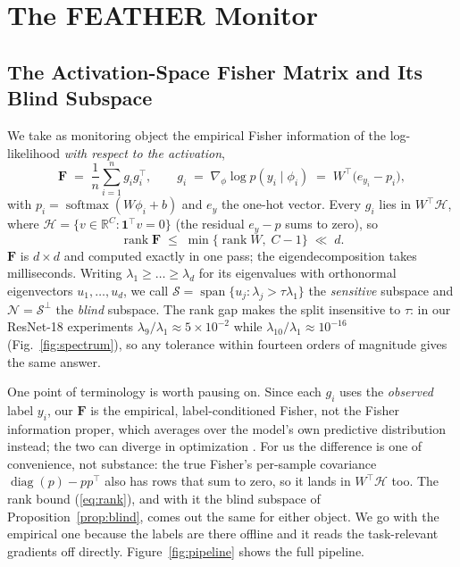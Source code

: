 \documentclass[graybox]{SNmult}
\newcommand{\R}{\mathbb{R}}
\newcommand{\F}{\mathbf{F}}
\newcommand{\act}{\phi}
\DeclareMathOperator{\rank}{rank}
\DeclareMathOperator{\diag}{diag}
\DeclareMathOperator{\spn}{span}
\DeclareMathOperator*{\softmax}{softmax}
\begin{document}
\section{The FEATHER Monitor}
\label{sec:method}

\subsection{The Activation-Space Fisher Matrix and Its Blind Subspace}
\label{sec:blind}

We take as monitoring object the empirical Fisher information of the
log-likelihood \emph{with respect to the activation},
\begin{equation}
  \F \;=\; \frac{1}{n}\sum_{i=1}^{n} g_i g_i^\top,
  \qquad
  g_i \;=\; \nabla_{\act}\log p(y_i \mid \act_i)
        \;=\; W^\top\!\big(e_{y_i} - p_i\big),
  \label{eq:fisher}
\end{equation}
with $p_i = \softmax(W\act_i + b)$ and $e_y$ the one-hot vector. Every $g_i$
lies in $W^\top\!\mathcal{H}$, where
$\mathcal{H} = \{v \in \R^C : \mathbf{1}^\top v = 0\}$ (the residual
$e_y - p$ sums to zero), so
\begin{equation}
  \rank \F \;\le\; \min\{\rank W,\; C-1\} \;\ll\; d .
  \label{eq:rank}
\end{equation}
$\F$ is $d \times d$ and computed exactly in one pass; the eigendecomposition
takes milliseconds. Writing $\lambda_1 \ge \dots \ge \lambda_d$ for its
eigenvalues with orthonormal eigenvectors $u_1,\dots,u_d$, we call
$\mathcal{S} = \spn\{u_j : \lambda_j > \tau\lambda_1\}$ the \emph{sensitive}
subspace and $\mathcal{N} = \mathcal{S}^\perp$ the \emph{blind} subspace. The
rank gap makes the split insensitive to $\tau$: in our ResNet-18 experiments
$\lambda_9/\lambda_1 \approx 5 \times 10^{-2}$ while
$\lambda_{10}/\lambda_1 \approx 10^{-16}$ (Fig.~\ref{fig:spectrum}), so any
tolerance within fourteen orders of magnitude gives the same answer.

One point of terminology is worth pausing on. Since each $g_i$ uses the
\emph{observed} label $y_i$, our $\F$ is the empirical, label-conditioned
Fisher, not the Fisher information proper, which averages over the model's own
predictive distribution instead; the two can diverge in optimization
\cite{kunstner2019empirical}. For us the difference is one of convenience, not
substance: the true Fisher's per-sample covariance $\diag(p) - pp^\top$ also
has rows that sum to zero, so it lands in $W^\top\!\mathcal{H}$ too. The rank
bound (\ref{eq:rank}), and with it the blind subspace of
Proposition~\ref{prop:blind}, comes out the same for either object. We go with
the empirical one because the labels are there offline and it reads the
task-relevant gradients off directly. Figure~\ref{fig:pipeline} shows the full
pipeline.
\end{document}
